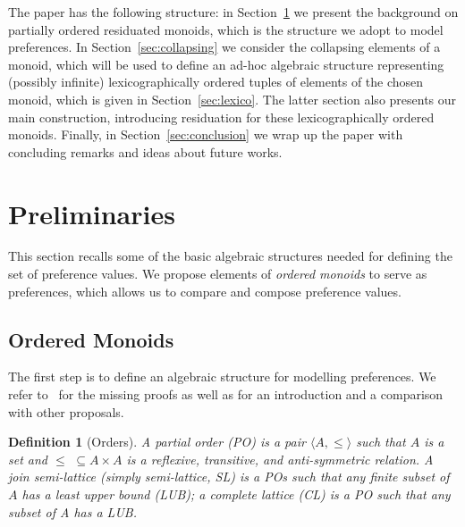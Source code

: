 \documentclass[a4paper]{elsarticle}
\newtheorem{definition}{Definition}
\newcommand{\1}{\mathbf{1}}
\begin{document}
The paper has the following structure: in Section~\ref{sec:om} we present  the background on partially ordered residuated monoids, which is the structure 
we adopt to model preferences. 
%
In Section~\ref{sec:collapsing} we consider the collapsing elements of a monoid, which will be used to define an ad-hoc algebraic structure representing 
(possibly infinite) lexicographically ordered tuples of elements of the chosen monoid, which is given in Section~\ref{sec:lexico}. 
The latter section also presents our main construction, introducing residuation for these lexicographically ordered monoids.  Finally, in Section~\ref{sec:conclusion} we wrap up the paper with concluding remarks and ideas about future works.
%

\section{Preliminaries}\label{sec:om}


This section recalls some of the basic algebraic structures needed for defining
the set of preference values. We propose elements of \emph{ordered monoids} 
to serve as preferences, which allows us to compare and compose preference values.



\subsection{Ordered Monoids}
\label{sec:lem}

The first step is to define an algebraic structure for modelling preferences. 
We refer to~\cite{ipl} for the missing proofs as well as for an introduction and a comparison with other proposals.

\begin{definition}[Orders]
	A partial order (PO) is a pair $\langle A, \leq \rangle$ such that
	$A$ is a set %
	and $\leq \,\,\subseteq A \times A$ is a reflexive, transitive, and
	anti-symmetric  relation.
	A join semi-lattice (simply semi-lattice, SL) is a POs
	such that any finite subset of $A$ has a least upper bound (LUB);
	a complete lattice (CL) is a PO such that any subset of A has a LUB.
\end{definition}
\end{document}

